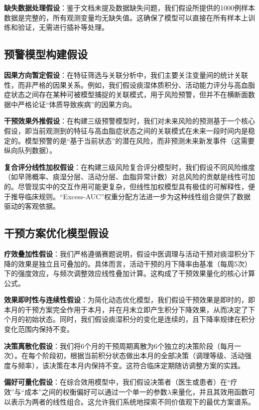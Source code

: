 \documentclass[12pt,a4paper]{ctexart}
\begin{document}
\textbf{缺失数据处理假设}：鉴于文档未提及数据缺失问题，我们假设所提供的1000例样本数据是完整的，所有观测变量均无缺失值。这确保了模型可以直接在所有样本上训练和验证，无需进行插补等处理。

\subsection{预警模型构建假设}
\textbf{因果方向暂定假设}：在特征筛选与关联分析中，我们主要关注变量间的统计关联性，而非严格的因果关系。例如，我们假设痰湿体质积分、活动能力评分与高血脂症状态之间存在某种可被模型捕捉的关联模式，用于风险预警，但并不在横断面数据中严格论证“体质导致疾病”的因果方向。

\textbf{干预效果外推假设}：在构建三级预警模型时，我们对未来风险的预测基于一个核心假设，即当前观测到的特征与高血脂症状态之间的关联模式在未来一段时间内是稳定的。模型预警的是“基于当前状态”的潜在风险，而非预测未来新发事件（这需要纵向队列数据）。

\textbf{复合评分线性加权假设}：在构建三级风险复合评分模型时，我们假设不同风险维度（如早筛概率、痰湿分层、活动分层、血脂异常计数）对总风险的贡献是线性可加的。尽管现实中的交互作用可能更复杂，但线性加权模型具有极佳的可解释性，便于推导临床规则。“Excess-AUC”权重分配方法进一步为这种线性组合提供了数据驱动的客观依据。

\subsection{干预方案优化模型假设}
\textbf{疗效叠加性假设}：我们严格遵循赛题说明，假设中医调理与活动干预对痰湿积分下降的效果是独立且可叠加的。具体而言，活动干预的月下降率由基准（每周5次）下的强度效应，与频次调整效应线性叠加计算。这构成了干预效果量化的核心计算公式。

\textbf{效果即时性与连续性假设}：为简化动态优化模型，我们假设干预效果是即时的，即本月的干预方案完全作用于本月，并在月末立即产生积分下降效果，从而决定了下个月的初始状态。同时，我们假设痰湿积分的变化是连续的，且下降率规律在积分变化范围内保持不变。

\textbf{决策离散化假设}：我们将6个月的干预周期离散为6个独立的决策阶段（每月一次）。在每个阶段初，根据当前积分状态做出本月的全部决策（调理等级、活动强度与频率），该决策在本月内保持不变。这符合临床定期随访调整方案的实践。

\textbf{偏好可量化假设}：在综合效用模型中，我们假设决策者（医生或患者）在“疗效”与“成本”之间的权衡偏好可以通过一个单一的参数$\lambda$来量化，并且其效用函数可以表示为两者的线性组合。这允许我们系统地探索不同价值观下的最优方案谱系。
\end{document}
